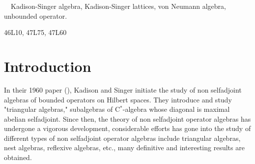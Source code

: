 \documentclass[12pt]{article}
\begin{document}
{\vspace{2mm}
\baselineskip 12pt

 \ \ Kadison-Singer algebra,
Kadison-Singer lattices, von Neumann algebra, unbounded operator.

\vspace{2mm}\baselineskip 12pt

46L10, 47L75, 47L60

\baselineskip 16pt

\section{Introduction}

In their 1960 paper (\cite{KS}), Kadison and Singer initiate the study of non selfadjoint
algebras of bounded operators on Hilbert spaces.  They introduce and study "triangular algebras,"
subalgebras of C$^{*}$-algebra whose diagonal is maximal abelian selfadjoint. 
Since then, the theory of non selfadjoint operator  algebras has undergone a vigorous 
development, considerable efforts has gone into the study of different types of  non selfadjoint operator algebras include
triangular algebras, nest algebras, reflexive algebras, etc., many definitive and interesting results are obtained.

}
\end{document}
